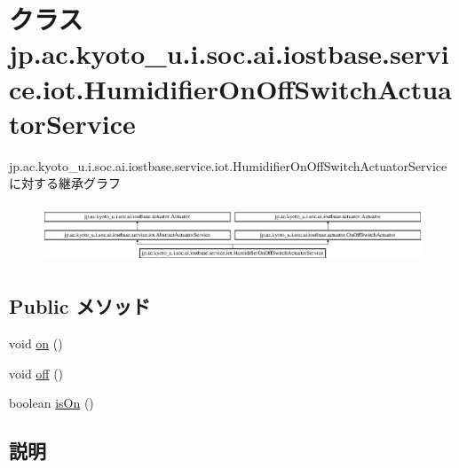 \hypertarget{classjp_1_1ac_1_1kyoto__u_1_1i_1_1soc_1_1ai_1_1iostbase_1_1service_1_1iot_1_1_humidifier_on_off_switch_actuator_service}{\section{クラス jp.\-ac.\-kyoto\-\_\-u.\-i.\-soc.\-ai.\-iostbase.\-service.\-iot.\-Humidifier\-On\-Off\-Switch\-Actuator\-Service}
\label{classjp_1_1ac_1_1kyoto__u_1_1i_1_1soc_1_1ai_1_1iostbase_1_1service_1_1iot_1_1_humidifier_on_off_switch_actuator_service}
}
jp.\-ac.\-kyoto\-\_\-u.\-i.\-soc.\-ai.\-iostbase.\-service.\-iot.\-Humidifier\-On\-Off\-Switch\-Actuator\-Serviceに対する継承グラフ\begin{figure}[H]
\begin{center}
\leavevmode
\includegraphics[height=1.753654cm]{classjp_1_1ac_1_1kyoto__u_1_1i_1_1soc_1_1ai_1_1iostbase_1_1service_1_1iot_1_1_humidifier_on_off_switch_actuator_service}
\end{center}
\end{figure}
\subsection*{Public メソッド}
\begin{DoxyCompactItemize}
\item 
void \hyperlink{classjp_1_1ac_1_1kyoto__u_1_1i_1_1soc_1_1ai_1_1iostbase_1_1service_1_1iot_1_1_humidifier_on_off_switch_actuator_service_a638b99c0e6c3fed473e8f4f82b81eed7}{on} ()
\item 
void \hyperlink{classjp_1_1ac_1_1kyoto__u_1_1i_1_1soc_1_1ai_1_1iostbase_1_1service_1_1iot_1_1_humidifier_on_off_switch_actuator_service_af54265f75391497751c345bd71146609}{off} ()
\item 
boolean \hyperlink{classjp_1_1ac_1_1kyoto__u_1_1i_1_1soc_1_1ai_1_1iostbase_1_1service_1_1iot_1_1_humidifier_on_off_switch_actuator_service_a10ce05f89058cc3fbd55f07b5f142bdd}{is\-On} ()
\end{DoxyCompactItemize}


\subsection{説明}


